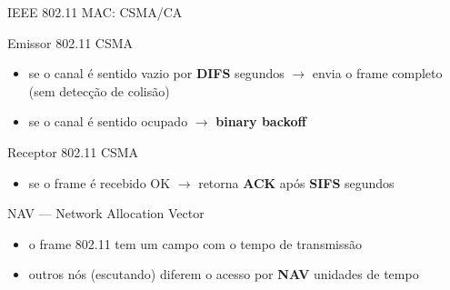 \documentclass[aspectratio=169,11pt]{beamer}
\begin{document}
\begin{frame}{IEEE 802.11 MAC: CSMA/CA}
  \begin{block}{Emissor 802.11 CSMA}
    \begin{itemize}
      \item se o canal é sentido vazio por \textbf{DIFS} segundos $\rightarrow$ envia o frame completo (sem detecção de colisão)
      \item se o canal é sentido ocupado $\rightarrow$ \textbf{binary backoff}
    \end{itemize}
  \end{block}
  \begin{block}{Receptor 802.11 CSMA}
    \begin{itemize}
      \item se o frame é recebido OK $\rightarrow$ retorna \textbf{ACK} após \textbf{SIFS} segundos
    \end{itemize}
  \end{block}
  \begin{exampleblock}{NAV --- Network Allocation Vector}
    \begin{itemize}
      \item o frame 802.11 tem um campo com o tempo de transmissão
      \item outros nós (escutando) diferem o acesso por \textbf{NAV} unidades de tempo
    \end{itemize}
  \end{exampleblock}
\end{frame}
\end{document}
